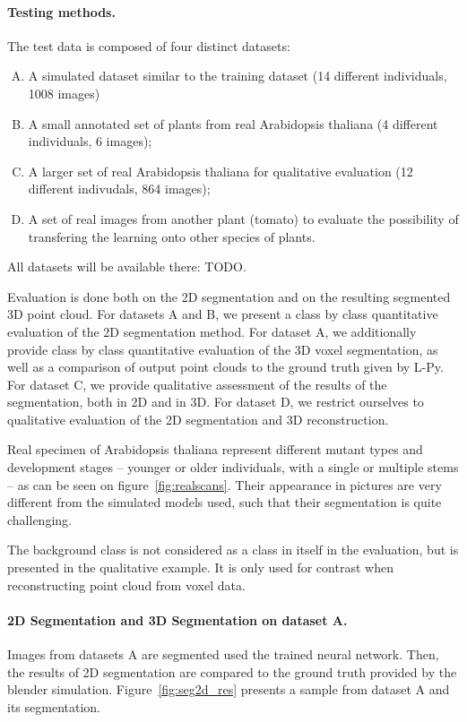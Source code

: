 \paragraph{Testing methods.} The test data is composed of four
distinct datasets:
\begin{enumerate}[A.]
    \item A simulated dataset similar to the training dataset (14 different individuals, 1008 images)
    \item A small annotated set of plants from real Arabidopsis thaliana (4 different individuals, 6 images);
    \item A larger set of real Arabidopsis thaliana for qualitative evaluation (12 different indivudals, 864 images);
    \item A set of real images from another plant (tomato) to evaluate the possibility of transfering the learning onto other species of plants.
\end{enumerate}
All datasets will be available there: TODO.

Evaluation is done both on the 2D segmentation and on the resulting segmented 3D point cloud. For datasets A and B,
we present a class by class quantitative evaluation of the 2D segmentation method. For dataset A, we additionally  provide
class by class quantitative evaluation of the 3D voxel segmentation, as well as a comparison of output point clouds
to the ground truth given by L-Py. For dataset C, we provide qualitative assessment of the results of the segmentation,
both in 2D and in 3D. For dataset D, we restrict ourselves to qualitative evaluation of the 2D segmentation and 3D reconstruction.

Real specimen of Arabidopsis thaliana represent different mutant types and
development stages -- younger or older individuals, with a single or multiple stems -- as can be seen on figure~\ref{fig:realscans}.
Their appearance in pictures are very different from the simulated models
used, such that their segmentation is quite challenging.

The background class is not considered as a class in itself in the evaluation, but is presented in the qualitative example. It
is only used for contrast when reconstructing point cloud from voxel data.

\paragraph{2D Segmentation and 3D Segmentation on dataset A.}
Images from datasets A are segmented used the trained neural network. Then, the results of 2D segmentation are
compared to the ground truth provided by the blender simulation. Figure~\ref{fig:seg2d_res} presents a sample from
dataset A and its segmentation.

